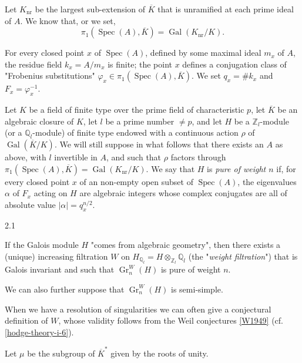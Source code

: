   Let \(K_\mathrm {nr}\) be the largest sub-extension of \(\overline {K}\) that is unramified at each prime ideal of \(A\).
  We know that, or we set,
  \[     \pi _1(\operatorname {Spec}(A),\overline {K})     = \operatorname {Gal}(K_\mathrm {nr}/K).   \]\par{}For every closed point \(x\) of \(\operatorname {Spec}(A)\), defined by some maximal ideal \(m_x\) of \(A\), the residue field \(k_x=A/m_x\) is finite;
  the point \(x\) defines a conjugation class of "Frobenius substitutions" \(\varphi _x\in \pi _1(\operatorname {Spec}(A),\overline {K})\).
  We set \(q_x=\#k_x\) and \(F_x=\varphi _x^{-1}\).\par{}Let \(K\) be a field of finite type over the prime field of characteristic \(p\), let \(\overline {K}\) be an algebraic closure of \(K\), let \(l\) be a prime number \(\neq  p\), and let \(H\) be a \(\mathbb {Z}_l\)-module (or a \(\mathbb {Q}_l\)-module) of finite type endowed with a continuous action \(\rho \) of \(\operatorname {Gal}(\overline {K}/K)\).
  We will still suppose in what follows that there exists an \(A\) as above, with \(l\) invertible in \(A\), and such that \(\rho \) factors through \(\pi _1(\operatorname {Spec}(A),\overline {K}) = \operatorname {Gal}(K_\mathrm {nr}/K)\).
  We say that \(H\) is \emph{pure of weight \(n\)} if, for every closed point \(x\) of an non-empty open subset of \(\operatorname {Spec}(A)\), the eigenvalues \(\alpha \) of \(F_x\) acting on \(H\) are algebraic integers whose complex conjugates are all of absolute value \(|\alpha |=q_x^{n/2}\).\begin{principle}{2.1}\label{hodge-theory-i-principle-2.1}\skipsinglepar\par{}If the Galois module \(H\) "comes from algebraic geometry", then there exists a (unique) increasing filtration \(W\) on \(H_{\mathbb {Q}_l}=H\otimes _{\mathbb {Z}_l}\mathbb {Q}_l\) (the "\emph{weight filtration}") that is Galois invariant and such that \(\operatorname {Gr}_n^W(H)\) is pure of weight \(n\).\end{principle}\par{}We can also further suppose that \(\operatorname {Gr}_n^W(H)\) is semi-simple.\par{}When we have a resolution of singularities we can often give a conjectural definition of \(W\), whose validity follows from the Weil conjectures \hyperref[W1949]{[W1949]} (cf. \cref{hodge-theory-i-6}).\par{}Let \(\mu \) be the subgroup of \(\overline {K}^*\) given by the roots of unity.
